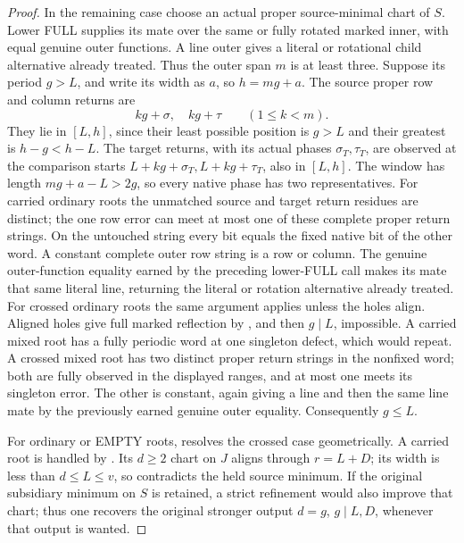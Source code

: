 \documentclass[11pt,a4paper]{amsart}
\numberwithin{equation}{section}
\theoremstyle{plain}
\theoremstyle{definition}
\begin{document}
\begin{proof}
In the remaining case choose an actual proper source-minimal chart of
\(S\).  Lower FULL supplies its mate over the same or fully rotated
marked inner, with equal genuine outer functions.  A line outer gives a
literal or rotational child alternative already treated.  Thus the outer
span \(m\) is at least three.  Suppose its period \(g>L\), and
write its width as \(a\), so \(h=mg+a\).
The source proper row and column returns are
\[
 kg+\sigma,\quad kg+\tau\qquad(1\le k<m).
\]
They lie in \([L,h]\), since their least possible position is
\(g>L\) and their greatest is \(h-g<h-L\).
The target returns, with its actual phases
\(\sigma_T,\tau_T\), are observed at the comparison starts
\(L+kg+\sigma_T,L+kg+\tau_T\), also in \([L,h]\).
The window has length \(mg+a-L>2g\), so every native phase has
two representatives.  For carried ordinary roots the unmatched
source and target return residues are distinct; the one row error
can meet at most one of these complete proper return strings.
On the untouched string every bit equals the fixed native bit of
the other word.  A constant complete outer row string is a row or
column.  The genuine outer-function equality earned by the preceding
lower-FULL call makes its mate that same literal line, returning
the literal or rotation alternative already treated.
For crossed ordinary roots the same argument applies unless the
holes align.  Aligned holes give full marked reflection by
, and then \(g\mid L\), impossible.
A carried mixed root has a fully periodic word at one singleton
defect, which would repeat.  A crossed mixed root has two distinct
proper return strings in the nonfixed word; both are fully observed
in the displayed ranges, and at most one meets its singleton error.
The other is constant, again giving a line and then the same line
mate by the previously earned genuine outer equality.
Consequently \(g\le L\).

For ordinary or EMPTY roots,  resolves the crossed
case geometrically.  A carried root is handled by
.  Its \(d\ge2\) chart on \(J\) aligns
through \(r=L+D\); its width is less than \(d\le L\le v\), so
 contradicts the held source minimum.  If the
original subsidiary minimum on \(S\) is retained, a strict refinement
would also improve that chart; thus one recovers the original stronger
output \(d=g\), \(g\mid L,D\), whenever that output is wanted.


\end{proof}
\end{document}

